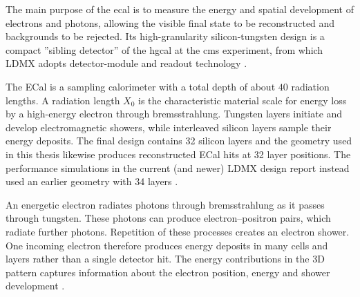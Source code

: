 The main purpose of the \gls{ecal} is to measure the energy and spatial
development of electrons and photons, allowing the visible final state to be
reconstructed and backgrounds to be rejected. Its high-granularity 
silicon-tungsten design is a compact ''sibling detector'' of the \gls{hgcal} at the \gls{cms} experiment, from which LDMX adopts detector-module and readout technology
\cite{ldmx2025-overview}.


The ECal is a sampling calorimeter with a total depth of about \(40\)
radiation lengths. A radiation length \(X_0\) is the characteristic material
scale for energy loss by a high-energy electron through bremsstrahlung.
Tungsten layers initiate and develop electromagnetic showers, while
interleaved silicon layers sample their energy deposits. The final design
contains 32 silicon layers 
and the  geometry used in this thesis likewise produces
reconstructed ECal hits at 32 layer positions. The performance simulations in
the current (and newer) LDMX design report instead used an earlier geometry with 34
layers 
\cite{ldmx2025-overview}.

An energetic electron radiates photons through \gls{bremsstrahlung} as it
passes through tungsten. These photons can produce electron--positron pairs,
which radiate further photons. Repetition of these processes creates an
\gls{electron shower}. One incoming electron therefore produces energy
deposits in many cells and layers rather than a single detector hit. The energy contributions in the 3D pattern captures information about the electron position,
energy and shower development \cite{groom2024-passage-particles}.

